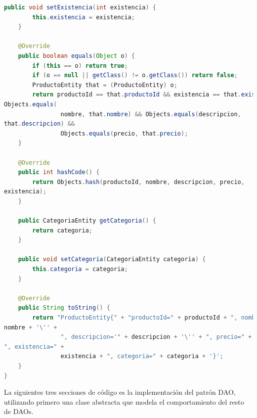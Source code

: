 \documentclass[a4paper,12pt]{article}
\begin{document}
\begin{lstlisting}[language=Java, style=customJava, 
caption={ProductoEntity.java}, captionpos=b,basicstyle=\fontfamily{cmss}\small]
    public void setExistencia(int existencia) {
        this.existencia = existencia;
    }

    @Override
    public boolean equals(Object o) {
        if (this == o) return true;
        if (o == null || getClass() != o.getClass()) return false;
        ProductoEntity that = (ProductoEntity) o;
        return productoId == that.productoId && existencia == that.existencia && 
Objects.equals(
                nombre, that.nombre) && Objects.equals(descripcion, 
that.descripcion) &&
                Objects.equals(precio, that.precio);
    }

    @Override
    public int hashCode() {
        return Objects.hash(productoId, nombre, descripcion, precio, 
existencia);
    }

    public CategoriaEntity getCategoria() {
        return categoria;
    }

    public void setCategoria(CategoriaEntity categoria) {
        this.categoria = categoria;
    }

    @Override
    public String toString() {
        return "ProductoEntity{" + "productoId=" + productoId + ", nombre='" + 
nombre + '\'' +
                ", descripcion='" + descripcion + '\'' + ", precio=" + precio + 
", existencia=" +
                existencia + ", categoria=" + categoria + '}';
    }
}
\end{lstlisting}

La siguientes tres secciones de código es la implementación del patrón DAO, 
utilizando primero una clase abstracta que modela el comportamiento del resto 
de DAOs.
\end{document}
